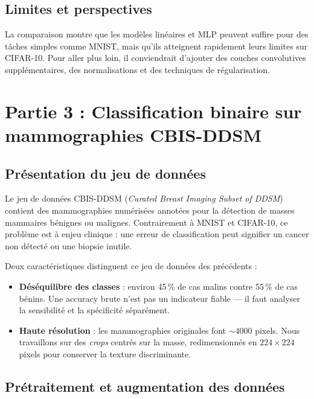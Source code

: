 \documentclass[a4paper,10pt]{article}
\begin{document}
\subsection{Limites et perspectives}

La comparaison montre que les modèles linéaires et MLP peuvent suffire pour des tâches
simples comme MNIST, mais qu'ils atteignent rapidement leurs limites sur CIFAR-10.
Pour aller plus loin, il conviendrait d'ajouter des couches convolutives supplémentaires,
des normalisations et des techniques de régularisation.

\clearpage
\section{Partie 3 : Classification binaire sur mammographies CBIS-DDSM}

\subsection{Présentation du jeu de données}

Le jeu de données CBIS-DDSM (\textit{Curated Breast Imaging Subset of DDSM}) contient des mammographies
numérisées annotées pour la détection de masses mammaires bénignes ou malignes.
Contrairement à MNIST et CIFAR-10, ce problème est à enjeu clinique : une erreur de classification
peut signifier un cancer non détecté ou une biopsie inutile.

Deux caractéristiques distinguent ce jeu de données des précédents :

\begin{itemize}
    \item \textbf{Déséquilibre des classes} : environ 45\,\% de cas malins contre 55\,\% de cas bénins.
          Une accuracy brute n'est pas un indicateur fiable — il faut analyser la sensibilité et la spécificité séparément.
    \item \textbf{Haute résolution} : les mammographies originales font $\sim$4000 pixels.
          Nous travaillons sur des \textit{crops} centrés sur la masse, redimensionnés en $224 \times 224$ pixels
          pour conserver la texture discriminante.
\end{itemize}

\subsection{Prétraitement et augmentation des données}
\end{document}
